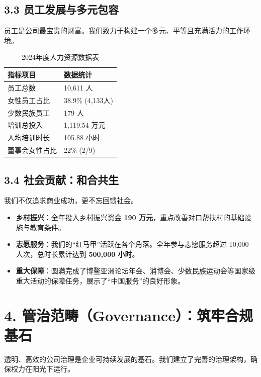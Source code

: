\documentclass[a4paper,12pt]{article}
\begin{document}
\subsection{3.3 员工发展与多元包容}

员工是公司最宝贵的财富。我们致力于构建一个多元、平等且充满活力的工作环境。

\begin{table}[h]
    \centering
    \caption{2024年度人力资源数据表}
    \label{tab:hr_data}
    \renewcommand{\arraystretch}{1.3}
    \begin{tabular}{p{6cm} p{4cm}}
        \toprule
        \textbf{指标项目} & \textbf{数据统计} \\
        \midrule
        员工总数 & 10,611 人 \\
        女性员工占比 & 38.9\% (4,133人) \\
        少数民族员工 & 179 人 \\
        培训总投入 & 1,119.54 万元 \\
        人均培训时长 & 105.88 小时 \\
        董事会女性占比 & 22\% (2/9) \\
        \bottomrule
    \end{tabular}
\end{table}

\subsection{3.4 社会贡献：和合共生}

我们不仅追求商业成功，更不忘回馈社会。

\begin{itemize}
    \item \textbf{乡村振兴}：全年投入乡村振兴资金 \textbf{190 万元}，重点改善对口帮扶村的基础设施与教育条件。
    \item \textbf{志愿服务}：我们的“红马甲”活跃在各个角落。全年参与志愿服务超过 10,000 人次，总时长累计达到 \textbf{500,000 小时}。
    \item \textbf{重大保障}：圆满完成了博鳌亚洲论坛年会、消博会、少数民族运动会等国家级重大活动的保障任务，展示了“中国服务”的良好形象。
\end{itemize}

\section{4. 管治范畴（Governance）：筑牢合规基石}

透明、高效的公司治理是企业可持续发展的基石。我们建立了完善的治理架构，确保权力在阳光下运行。
\end{document}
